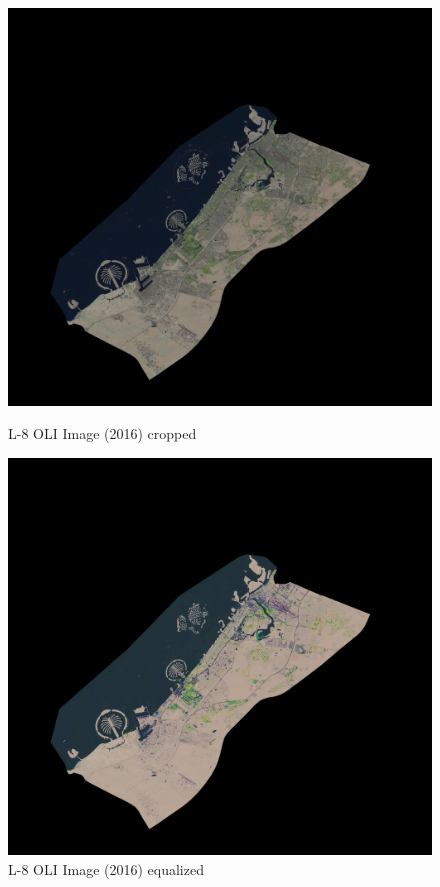 \begin{figure}[h!]
\centering
\begin{minipage}{.5\textwidth}
	\centering
	\includegraphics[width=\textwidth-3em]{code/imagedata/alldata/2016cropped}
	\caption{L-8 OLI Image (2016) cropped}
	\label{fig:L8OLI_16_cropped}
\end{minipage}%
\begin{minipage}{.5\textwidth}
	\centering
	\includegraphics[width=\textwidth-3em]{code/imagedata/alldata/2016cropped_refd}
	\caption{L-8 OLI Image (2016) equalized}
	\label{fig:L8_OLI_16_equalised}
\end{minipage}
\end{figure}


